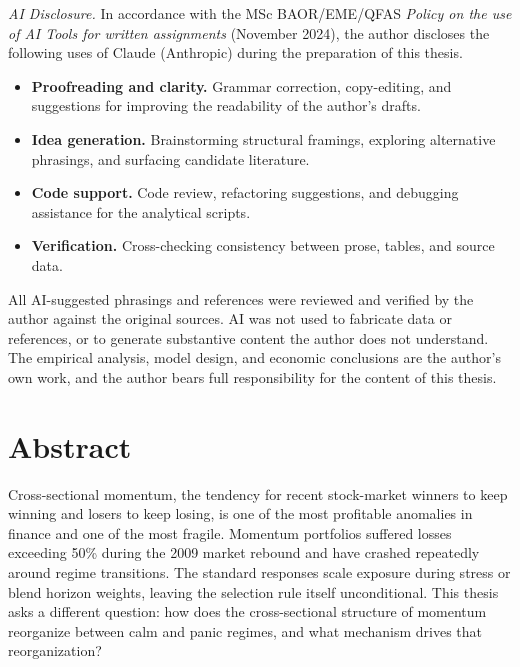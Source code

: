 \documentclass[12pt, a4paper]{article}
\begin{document}
\noindent\textit{AI Disclosure.} In accordance with the MSc BAOR/EME/QFAS \emph{Policy on the use of AI Tools for written assignments} (November 2024), the author discloses the following uses of Claude (Anthropic) during the preparation of this thesis.
\begin{itemize}
    \item \textbf{Proofreading and clarity.} Grammar correction, copy-editing, and suggestions for improving the readability of the author's drafts.
    \item \textbf{Idea generation.} Brainstorming structural framings, exploring alternative phrasings, and surfacing candidate literature.
    \item \textbf{Code support.} Code review, refactoring suggestions, and debugging assistance for the analytical scripts.
    \item \textbf{Verification.} Cross-checking consistency between prose, tables, and source data.
\end{itemize}
All AI-suggested phrasings and references were reviewed and verified by the author against the original sources. AI was not used to fabricate data or references, or to generate substantive content the author does not understand. The empirical analysis, model design, and economic conclusions are the author's own work, and the author bears full responsibility for the content of this thesis.

\newpage

\section*{Abstract}

Cross-sectional momentum, the tendency for recent stock-market winners to keep winning and losers to keep losing, is one of the most profitable anomalies in finance and one of the most fragile. Momentum portfolios suffered losses exceeding 50\% during the 2009 market rebound and have crashed repeatedly around regime transitions. The standard responses scale exposure during stress or blend horizon weights, leaving the selection rule itself unconditional. This thesis asks a different question: how does the cross-sectional structure of momentum reorganize between calm and panic regimes, and what mechanism drives that reorganization?
\end{document}
